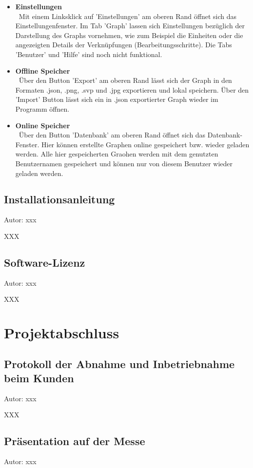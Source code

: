 \documentclass[twoside]{report}
\begin{document}
\begin{itemize}
  \item \textbf{ Einstellungen }
    \\\
      Mit einem Linksklick auf 'Einstellungen' am oberen Rand öffnet sich das Einstellungenfenster. Im Tab 'Graph' lassen sich Einstellungen bezüglich der Darstellung des Graphs vornehmen, wie zum Beispiel die Einheiten oder die angezeigten Details der Verknüpfungen (Bearbeitungsschritte).  Die Tabs 'Benutzer' und 'Hilfe' sind noch nicht funktional.
  \item \textbf{ Offline Speicher }
    \\\
      Über den Button 'Export' am oberen Rand lässt sich der Graph in den Formaten .json, .png, .svp und .jpg exportieren und lokal speichern. Über den 'Import' Button lässt sich ein in .json exportierter Graph wieder im Programm öffnen.
  \item \textbf{ Online Speicher }
    \\\
      Über den Button 'Datenbank' am oberen Rand öffnet sich das Datenbank-Fenster. Hier können erstellte Graphen online gespeichert bzw. wieder geladen werden. Alle hier gespeicherten Graohen werden mit dem genutzten Benutzernamen gespeichert und können nur von diesem Benutzer wieder geladen werden.
\end{itemize}


\subsection{Installationsanleitung}
{\small Autor: xxx}

XXX

\subsection{Software-Lizenz}
{\small Autor: xxx}

XXX


\section{Projektabschluss}

\subsection{Protokoll der Abnahme und Inbetriebnahme beim Kunden}
{\small Autor: xxx}

XXX

\subsection{Präsentation auf der Messe}
{\small Autor: xxx}
\end{document}
